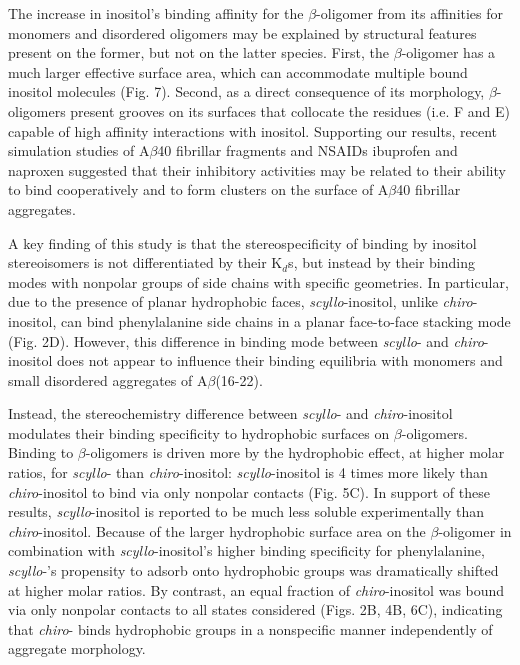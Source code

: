 The increase in inositol's binding affinity for the $\beta$-oligomer from its affinities for monomers and disordered oligomers may be explained by structural features present on the former, but not on the latter species. First, the $\beta$-oligomer has a much larger effective surface area, which can accommodate multiple bound inositol molecules (Fig. 7). Second, as a direct consequence of its morphology,  $\beta$-oligomers present grooves on its surfaces that collocate the residues (i.e. F and E) capable of high affinity interactions with inositol. Supporting our results, recent simulation studies of A$\beta$40 fibrillar fragments and NSAIDs ibuprofen and naproxen\cite{Takeda:2010p34,Raman:2009p47} suggested that their inhibitory activities may be related to their ability to bind cooperatively and to form clusters on the surface of A$\beta$40 fibrillar aggregates.

A key finding of this study is that the stereospecificity of binding by inositol stereoisomers is not differentiated by their K$_{d}$s, but instead by their binding modes with nonpolar groups of side chains with specific geometries. In particular, due to the presence of planar hydrophobic faces, \emph{scyllo}-inositol, unlike \emph{chiro}-inositol, can bind phenylalanine side chains in a planar face-to-face stacking mode (Fig. 2D). However, this difference in binding mode between \emph{scyllo}- and \emph{chiro}-inositol does not appear to influence their binding equilibria with monomers and small disordered aggregates of A$\beta$(16-22).

Instead, the stereochemistry difference between \emph{scyllo}- and \emph{chiro}-inositol modulates their binding specificity to hydrophobic surfaces on $\beta$-oligomers. Binding to $\beta$-oligomers is driven more by the hydrophobic effect, at higher molar ratios, for \emph{scyllo}- than \emph{chiro}-inositol: \emph{scyllo}-inositol is 4 times more likely than \emph{chiro}-inositol to bind via only nonpolar contacts (Fig. 5C). In support of these results, \emph{scyllo}-inositol is reported to be much less soluble experimentally than \emph{chiro}-inositol.\cite{Husson:1998wj} Because of the larger hydrophobic surface area on the $\beta$-oligomer in combination with \emph{scyllo}-inositol's higher binding specificity for phenylalanine,  \emph{scyllo}-'s propensity to adsorb onto hydrophobic groups was dramatically shifted at higher molar ratios.  By contrast, an equal fraction of \emph{chiro}-inositol was bound via only nonpolar contacts to all states considered (Figs. 2B, 4B, 6C), indicating that \emph{chiro}- binds hydrophobic groups in a nonspecific manner independently of aggregate morphology.
 
